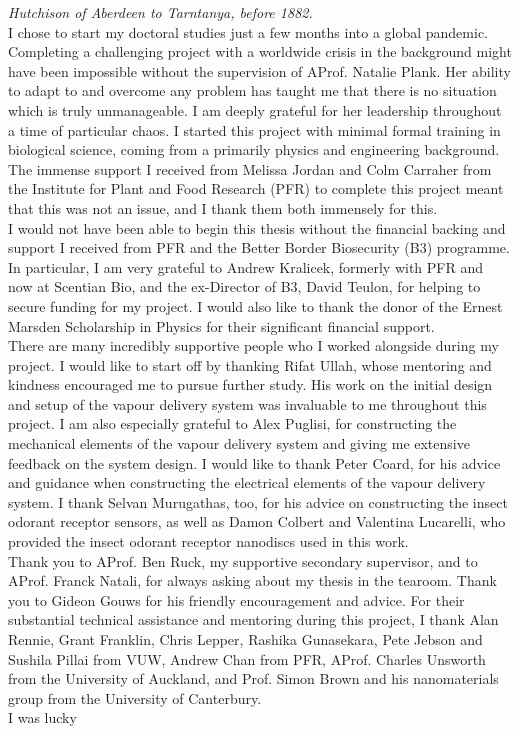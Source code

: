 \documentclass[
  a4paper,
]{scrbook}
\begin{document}
\textit{Hutchison of Aberdeen to Tarntanya, before 1882.} \\[5pt] 
I chose to start my doctoral studies just a few months into a global pandemic. Completing a challenging project with a worldwide crisis in the background might have been impossible without the supervision of AProf. Natalie Plank. Her ability to adapt to and overcome any problem has taught me that there is no situation which is truly unmanageable. I am deeply grateful for her leadership throughout a time of particular chaos. \newpage
\fancyhf{} %
\thispagestyle{fancy} %
\renewcommand{\headrulewidth}{0pt}
\fancyfoot[L]{\thepage} %
I started this project with minimal formal training in biological science, coming from a primarily physics and engineering background. \\[5pt] The immense support I received from Melissa Jordan and Colm Carraher from the Institute for Plant and Food Research (PFR) to complete this project meant that this was not an issue, and I thank them both immensely for this. \\[5pt] I would not have been able to begin this thesis without the financial backing and support I received from PFR and the Better Border Biosecurity (B3) programme. In particular, I am very grateful to Andrew Kralicek, formerly with PFR and now at Scentian Bio, and the ex-Director of B3, David Teulon, for helping to secure funding for my project. I would also like to thank the donor of the Ernest Marsden Scholarship in Physics for their significant financial support. \\[5pt] There are many incredibly supportive people who I worked alongside during my project. I would like to start off by thanking Rifat Ullah, whose mentoring and kindness encouraged me to pursue further study. His work on the initial design and setup of the vapour delivery system was invaluable to me throughout this project. I am also especially grateful to Alex Puglisi, for constructing the mechanical elements of the vapour delivery system and giving me extensive feedback on the system design. I would like to thank Peter Coard, for his advice and guidance when constructing the electrical elements of the vapour delivery system. I thank Selvan Murugathas, too, for his advice on constructing the insect odorant receptor sensors, as well as Damon Colbert and Valentina Lucarelli, who provided the insect odorant receptor nanodiscs used in this work. \\[5pt] Thank you to AProf. Ben Ruck, my supportive secondary supervisor, and to AProf. Franck Natali, for always asking about my thesis in the tearoom. Thank you to Gideon Gouws for his friendly encouragement and advice. For their substantial technical assistance and mentoring during this project, I thank Alan Rennie, Grant Franklin, Chris Lepper, Rashika Gunasekara, Pete Jebson and Sushila Pillai from VUW, Andrew Chan from PFR, AProf. Charles Unsworth from the University of Auckland, and Prof. Simon Brown and his nanomaterials group from the University of Canterbury. \\[5pt] I was lucky 
\end{document}
